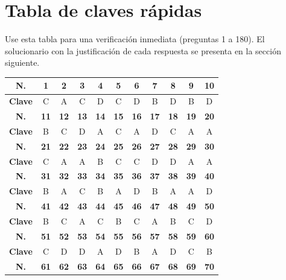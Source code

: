 \newpage
\section*{Tabla de claves rápidas}

\noindent Use esta tabla para una verificación inmediata (preguntas 1 a 180). El solucionario con la justificación de cada respuesta se presenta en la sección siguiente.

\vspace{0.35cm}
\begin{center}
\footnotesize
\renewcommand{\arraystretch}{1.25}
\begin{tabular}{|c|c|c|c|c|c|c|c|c|c|c|}
\hline
\textbf{N.} & \textbf{1} & \textbf{2} & \textbf{3} & \textbf{4} & \textbf{5} & \textbf{6} & \textbf{7} & \textbf{8} & \textbf{9} & \textbf{10} \\
\hline
\textbf{Clave} & C & A & C & D & C & D & B & D & B & D \\
\hline
\textbf{N.} & \textbf{11} & \textbf{12} & \textbf{13} & \textbf{14} & \textbf{15} & \textbf{16} & \textbf{17} & \textbf{18} & \textbf{19} & \textbf{20} \\
\hline
\textbf{Clave} & B & C & D & A & C & A & D & C & A & A \\
\hline
\textbf{N.} & \textbf{21} & \textbf{22} & \textbf{23} & \textbf{24} & \textbf{25} & \textbf{26} & \textbf{27} & \textbf{28} & \textbf{29} & \textbf{30} \\
\hline
\textbf{Clave} & C & A & A & B & C & C & D & D & A & A \\
\hline
\textbf{N.} & \textbf{31} & \textbf{32} & \textbf{33} & \textbf{34} & \textbf{35} & \textbf{36} & \textbf{37} & \textbf{38} & \textbf{39} & \textbf{40} \\
\hline
\textbf{Clave} & B & A & C & B & A & D & B & A & A & D \\
\hline
\textbf{N.} & \textbf{41} & \textbf{42} & \textbf{43} & \textbf{44} & \textbf{45} & \textbf{46} & \textbf{47} & \textbf{48} & \textbf{49} & \textbf{50} \\
\hline
\textbf{Clave} & B & C & A & C & B & C & A & B & C & D \\
\hline
\textbf{N.} & \textbf{51} & \textbf{52} & \textbf{53} & \textbf{54} & \textbf{55} & \textbf{56} & \textbf{57} & \textbf{58} & \textbf{59} & \textbf{60} \\
\hline
\textbf{Clave} & C & D & D & A & D & B & A & D & C & B \\
\hline
\textbf{N.} & \textbf{61} & \textbf{62} & \textbf{63} & \textbf{64} & \textbf{65} & \textbf{66} & \textbf{67} & \textbf{68} & \textbf{69} & \textbf{70} \\

\end{tabular}
\end{center}
